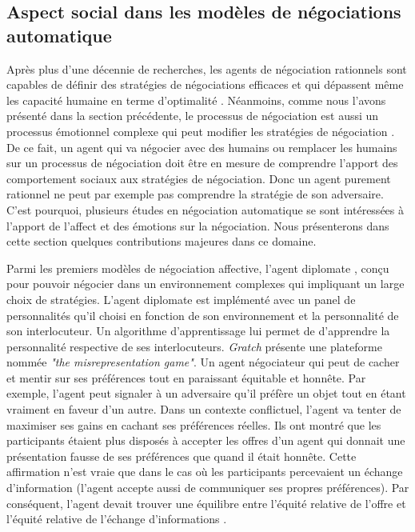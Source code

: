 	
	
	\subsection{Aspect social dans les modèles de négociations automatique}
	
	 Après plus d'une décennie de recherches, les agents de négociation rationnels sont capables de définir des stratégies de négociations efficaces et qui dépassent même les capacité humaine en terme d'optimalité \cite{jonker2012negotiating}. Néanmoins, comme nous l'avons présenté dans la section précédente, le processus de négociation est aussi un processus émotionnel complexe qui peut modifier les stratégies de négociation \cite{broekens2010affective}. De ce fait, 
	 un agent qui va négocier avec des humains ou remplacer les humains sur un processus de négociation doit être en mesure de comprendre l'apport des comportement sociaux aux stratégies de négociation. Donc un agent purement rationnel ne peut par exemple pas comprendre la stratégie de son adversaire. 
	 C'est pourquoi, plusieurs études en négociation automatique se sont intéressées à l'apport de l'affect et des émotions sur la négociation. Nous présenterons dans cette section quelques contributions majeures dans ce domaine. 
	 
	 Parmi les premiers modèles de négociation affective, l'agent diplomate \cite{kraus1995designing}, conçu pour pouvoir négocier dans un environnement complexes qui impliquant un large choix de stratégies. L'agent diplomate est implémenté avec un panel de personnalités qu'il choisi en fonction de son environnement et la personnalité de son interlocuteur.  Un algorithme d'apprentissage lui permet de d'apprendre la personnalité respective de ses interlocuteurs. 
	 \emph{Gratch} \cite{gratch2016misrepresentation} présente une plateforme nommée \emph{"the misrepresentation game"}. Un agent négociateur qui peut de cacher et mentir sur ses préférences tout en paraissant équitable et honnête. Par exemple, l'agent peut signaler à un adversaire qu'il préfère un objet tout en étant vraiment en faveur d'un autre. Dans un contexte conflictuel, l'agent va tenter de maximiser ses gains en cachant ses préférences réelles. Ils ont montré que les participants étaient plus disposés à accepter les offres d'un agent qui donnait une présentation fausse de ses préférences que quand il était honnête. Cette affirmation n'est vraie que dans le cas où les participants percevaient un échange d'information (l'agent accepte aussi de communiquer ses propres préférences). Par conséquent, l'agent devait trouver une équilibre entre l'équité relative de l'offre et l'équité relative de l'échange d'informations \cite{gratch2016misrepresentation}.
	 
